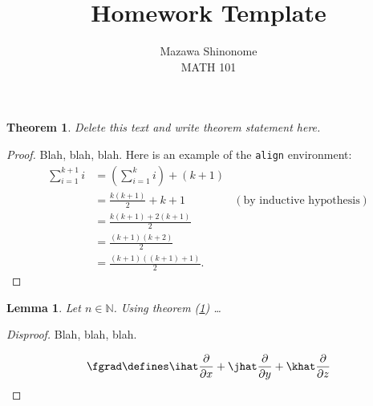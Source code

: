 \documentclass[a4paper]{article}
\newtheorem{lemma}{Lemma}
\newtheorem{thm}{Theorem}
\theoremstyle{remark}
\theoremstyle{remark}
\newcommand*{\pref}[2]{#1 (\ref{#2})}
\begin{document}
 
\title{Homework Template}
\author{Mazawa Shinonome \\ MATH 101}
 
\maketitle
 
\begin{thm}\label{my-theorem}
Delete this text and write theorem statement here.
\end{thm}
 
\begin{proof}
Blah, blah, blah.  Here is an example of the \texttt{align} environment:
\begin{align*}
    \sum_{i=1}^{k+1}i & = \left(\sum_{i=1}^{k}i\right) +(k+1)                     \\ 
                      & = \frac{k(k+1)}{2}+k+1 & (\text{by inductive hypothesis}) \\
                      & = \frac{k(k+1)+2(k+1)}{2}                                 \\
                      & = \frac{(k+1)(k+2)}{2}                                    \\
                      & = \frac{(k+1)((k+1)+1)}{2}.
\end{align*}
\end{proof}
 
\begin{lemma}
Let $n\in \mathbb{N}$. Using \pref{theorem}{my-theorem} \dots
\end{lemma}
 
\begin{proof}[Disproof]
Blah, blah, blah.

\begin{equation}\label{gradient-operator}
    \fgrad \defines \ihat\frac{\partial}{\partial x} + \jhat\frac{\partial}{\partial y} + \khat\frac{\partial}{\partial z}
\end{equation}

\end{proof}
 
\end{document}
